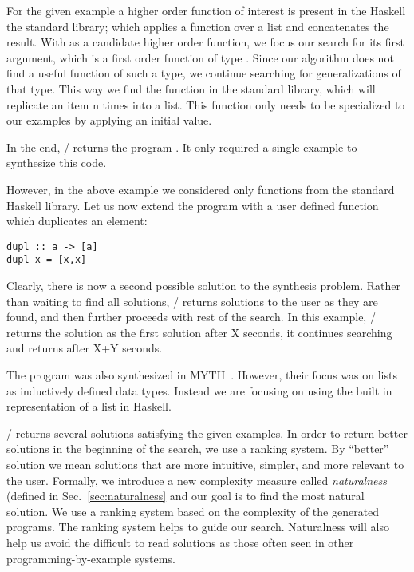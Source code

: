 For the given example a higher order function of interest is present in the Haskell the standard library;  which applies a function over a list and concatenates the result.
With  as a candidate higher order function, we focus
 our search for its first argument, which is a first order function of type .
Since our algorithm does not find a useful function of such a type, we continue searching for generalizations of that type.
This way we find the function  in the standard library, which will replicate an item n times into a list.
This function only needs to be specialized to our examples by applying an initial value.

In the end, \ourTool/ returns the program . It only required a single example to synthesize this code.

However, in the above example we considered only functions from the standard Haskell library. Let us now extend the program with a user defined function  which duplicates an element:
\begin{lstlisting}
dupl :: a -> [a]
dupl x = [x,x]
\end{lstlisting}

Clearly, there is now a second possible solution to the synthesis problem.
Rather than waiting to find all solutions, \ourTool/ returns solutions to the user as they are found, and then further proceeds with rest of the search.
In this example, \ourTool/ returns the solution  as the first solution after X seconds, it continues searching and returns  after X+Y seconds.

The  program was also synthesized in MYTH~\cite{Osera:2015}. However, their focus was on lists as inductively defined data types. Instead we 
are focusing on using the built in representation of a list in Haskell.

\ourTool/ returns several solutions satisfying the given examples. In
 order to return better solutions in the beginning of the search, we use a ranking system. By ``better'' solution we mean solutions that are more intuitive, simpler, and more relevant to the user. Formally, we introduce a new complexity measure called \textit{naturalness} (defined in 
Sec.~\ref{sec:naturalness} and our goal is to find the most natural solution. We use a ranking system based on the complexity of the 
generated programs. The ranking system helps to guide our search.
Naturalness will also help us avoid the difficult to read solutions as those often seen in other programming-by-example systems.

